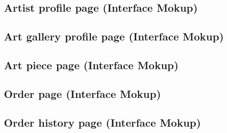 \subsection{Artist profile page (Interface Mokup)}
\subsection{Art gallery profile page (Interface Mokup)}
\subsection{Art piece page (Interface Mokup)}
\subsection{Order page (Interface Mokup)}
\subsection{Order history page (Interface Mokup)}
